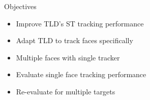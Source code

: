 \documentclass[mathserif, 14pt, xcolor=svgnames]{beamer}
\begin{document}
\bgroup
\begin{frame}{Objectives}
  \begin{itemize}
     \setlength\itemsep{1.2em}
    \item \hspace{0pt}
      \pause Improve TLD's ST tracking performance
    \item \hspace{0pt}
      \pause Adapt TLD to track faces specifically
    \item \hspace{0pt}
      \pause
        Multiple faces with single tracker
    \item \hspace{0pt}
      \pause
        Evaluate single face tracking performance
    \item \hspace{0pt}
      \pause
        Re-evaluate for multiple targets
  \end{itemize}
\end{frame}
\egroup

\bgroup
\end{document}
